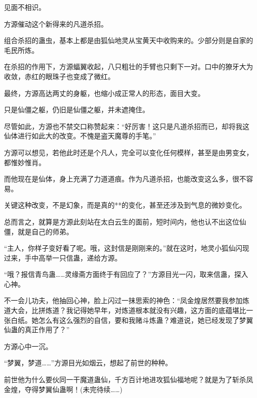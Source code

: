 \begin{this_body}
见面不相识。

方源催动这个新得来的凡道杀招。

组合杀招的蛊虫，基本上都是由狐仙地灵从宝黄天中收购来的。少部分则是自家的毛民所炼。

在杀招的作用下，方源蝠翼收起，八只粗壮的手臂也只剩下一对。口中的獠牙大为收敛，赤红的眼珠子也变成了微红。

最终，方源高达两丈的身躯，也缩小成正常人的形态，面目大变。

只是仙僵之躯，仍旧是仙僵之躯，并未遮掩住。

尽管如此，方源也不禁交口称赞起来：“好厉害！这只是凡道杀招而已，却将我这仙体进行如此大的改变。不愧是盗天魔尊的手笔。”

方源可以想见，若他此时还是个凡人，完全可以变化任何模样，甚至是由男变女，都惟妙惟肖。

而他现在是仙体，身上充满了力道道痕。作为凡道杀招，也能改变这么多，很不容易。

关键这种改变，不是幻象，而是真的**的变化，甚至还涉及到气息的微妙变化。

总而言之，就算是方源此刻站在太白云生的面前，短时间内，他也认不出这位仙僵，就是自己的师弟。

“主人，你样子变好看了呢。哦，这封信是刚刚来的。”就在这时，地灵小狐仙闪现过来，手中高举一只信蛊，递给方源。

“哦？报信青鸟蛊……灵缘斋方面终于有回应了？”方源目光一闪，取来信蛊，探入心神。

不一会儿功夫，他抽回心神，脸上闪过一抹思索的神色：“凤金煌居然要我参加炼道大会，比拼炼道？我记得她早年，对炼道根本就没有兴趣，这方面的底蕴堪比一张白纸。她怎么有这么强烈的自信，要和我赌斗炼蛊？难道说，她已经发现了梦翼仙蛊的真正作用了？”

方源心中一沉。

“梦翼，梦道……”方源目光如烟云，想起了前世的种种。

前世他为什么要伙同一干魔道蛊仙，千方百计地进攻狐仙福地呢？就是为了斩杀凤金煌，夺得梦翼仙蛊啊！(未完待续……)

\end{this_body}

